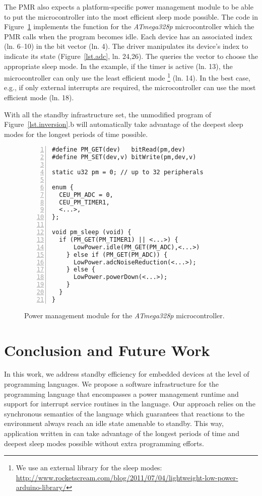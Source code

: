 The PMR also expects a platform-specific power management module to be able to
put the microcontroller into the most efficient sleep mode possible.
%
The code in Figure~\ref{lst.pm} implements the  function for
the \emph{ATmega328p} microcontroller which the PMR calls when the program
becomes idle.
%
Each device has an associated index (ln. 6--10) in the  bit vector
(ln. 4).
%
The driver manipulates its device's index to indicate its state
(Figure~\ref{lst.adc}, ln. 24,26).
%
The  queries the vector to choose the appropriate sleep mode.
In the example, if the timer is active (ln. 13), the microcontroller can only
use the least efficient mode%
\footnote{
    We use an external library for the sleep modes:
    \url{http://www.rocketscream.com/blog/2011/07/04/lightweight-low-power-arduino-library/}
}
(ln. 14).
%
In the best case, e.g., if only external interrupts are required, the
microcontroller can use the most efficient mode (ln. 18).

With all the standby infrastructure set, the unmodified program of
Figure~\ref{lst.inversion}.b will automatically take advantage of the deepest
sleep modes for the longest periods of time possible.

\begin{figure}[t]
\begin{lstlisting}[numbers=left]
#define PM_GET(dev)   bitRead(pm,dev)
#define PM_SET(dev,v) bitWrite(pm,dev,v)

static u32 pm = 0; // up to 32 peripherals

enum {
  CEU_PM_ADC = 0,
  CEU_PM_TIMER1,
  <...>,
};

void pm_sleep (void) {
  if (PM_GET(PM_TIMER1) || <...>) {
      LowPower.idle(PM_GET(PM_ADC),<...>)
    } else if (PM_GET(PM_ADC)) {
      LowPower.adcNoiseReduction(<...>);
    } else {
      LowPower.powerDown(<...>);
    }
  }
}
\end{lstlisting}
\caption{ Power management module for the \emph{ATmega328p} microcontroller.
\label{lst.pm}
}
\end{figure}

\section{Conclusion and Future Work}
\label{sec.conclusion}

In this work, we address standby efficiency for embedded devices at the level
of programming languages.
%
We propose a software infrastructure for the programming language \CEU that
encompasses a power management runtime and support for interrupt service
routines in the language.
%
Our approach relies on the synchronous semantics of the language which
guarantees that reactions to the environment always reach an idle state
amenable to standby.
%
This way, application written in \CEU can take advantage of the longest periods
of time and deepest sleep modes possible without extra programming efforts.

